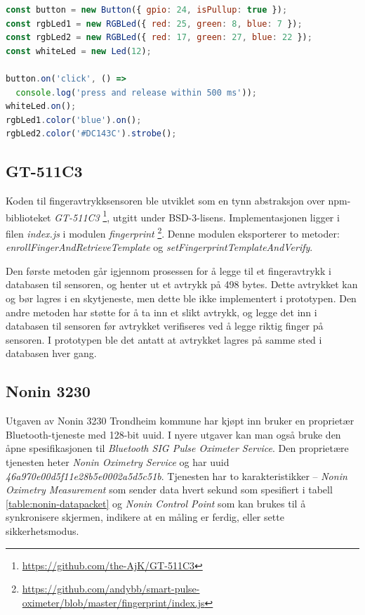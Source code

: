 \begin{lstlisting}[frame=single, language=JavaScript,
    caption=Bruk av pigpio-components, label=lst:pigpio-components-usage]
const button = new Button({ gpio: 24, isPullup: true });
const rgbLed1 = new RGBLed({ red: 25, green: 8, blue: 7 });
const rgbLed2 = new RGBLed({ red: 17, green: 27, blue: 22 });
const whiteLed = new Led(12);

button.on('click', () =>
  console.log('press and release within 500 ms'));
whiteLed.on();
rgbLed1.color('blue').on();
rgbLed2.color('#DC143C').strobe();
\end{lstlisting}

\subsection{GT-511C3}
Koden til fingeravtrykksensoren ble utviklet som en tynn abstraksjon over \gls{npm}-biblioteket \textit{GT-511C3}
\footnote{\url{https://github.com/the-AjK/GT-511C3}}, utgitt under BSD-3-lisens. Implementasjonen ligger
i filen \textit{index.js} i modulen \textit{fingerprint}
\footnote{\url{https://github.com/andybb/smart-pulse-oximeter/blob/master/fingerprint/index.js}}.
Denne modulen eksporterer to metoder: \textit{enrollFingerAndRetrieveTemplate} og \textit{setFingerprintTemplateAndVerify}.

Den første metoden går igjennom prosessen for å legge til et fingeravtrykk i databasen til sensoren, og henter ut et avtrykk
på 498 bytes. Dette avtrykket kan og bør lagres i en skytjeneste, men dette ble ikke implementert i prototypen.
Den andre metoden har støtte for å ta inn et slikt avtrykk, og legge det inn i databasen til sensoren før avtrykket
verifiseres ved å legge riktig finger på sensoren. I prototypen ble det antatt at avtrykket lagres på samme sted i databasen hver gang.

\subsection{Nonin 3230}
Utgaven av Nonin 3230 Trondheim kommune har kjøpt inn bruker en proprietær Bluetooth-tjeneste med 128-bit \gls{uuid}.
I nyere utgaver kan man også bruke den åpne spesifikasjonen til \textit{Bluetooth SIG Pulse Oximeter Service}.
Den proprietære tjenesten heter \textit{Nonin Oximetry Service} og har \gls{uuid} \textit{46a970e00d5f11e28b5e0002a5d5c51b}.
Tjenesten har to karakteristikker -- \textit{Nonin Oximetry Measurement} som sender data hvert sekund som spesifiert
i tabell \ref{table:nonin-datapacket} og \textit{Nonin Control Point} som kan brukes til å synkronisere skjermen,
indikere at en måling er ferdig, eller sette sikkerhetsmodus. 

